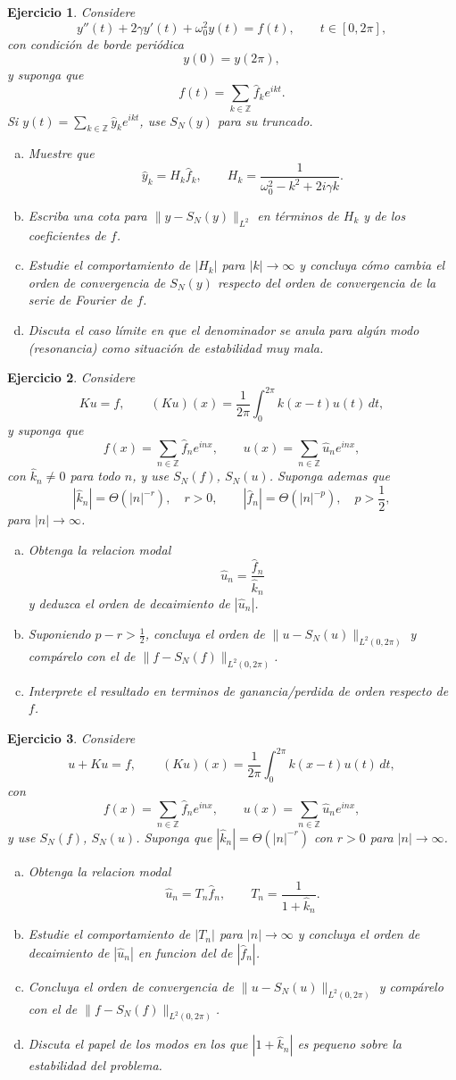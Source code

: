 \documentclass[12pt]{article}
\newtheorem{exercise}{Ejercicio}
\newcommand{\bej}{\begin{exercise}\rm}
\newcommand{\fej}{\end{exercise}}
\begin{document}
\bej
Considere
\[
y''(t)+2\gamma y'(t)+\omega_0^2y(t)=f(t),\qquad t\in[0,2\pi],
\]
con condición de borde periódica
\[
y(0)=y(2\pi),
\]
y suponga que
\[
f(t)=\sum_{k\in\mathbb Z}\hat f_k e^{ikt}.
\]
Si $y(t)=\sum_{k\in\mathbb Z}\hat y_k e^{ikt}$, use $S_N(y)$ para su truncado.
\begin{enumerate}[(a)]
    \item Muestre que
    \[
    \hat y_k=H_k\hat f_k,\qquad H_k=\frac{1}{\omega_0^2-k^2+2i\gamma k}.
    \]
    \item Escriba una cota para $\|y-S_N(y)\|_{L^2}$ en términos de $H_k$ y de los coeficientes de $f$.
    \item Estudie el comportamiento de $|H_k|$ para $|k|\to\infty$ y concluya cómo cambia el orden de convergencia de $S_N(y)$ respecto del orden de convergencia de la serie de Fourier de $f$.
    \item Discuta el caso límite en que el denominador se anula para algún modo (resonancia) como situación de estabilidad muy mala.
\end{enumerate}
\fej

\bej
Considere
\[
Ku=f,
\qquad
(Ku)(x)=\frac{1}{2\pi}\int_0^{2\pi}k(x-t)u(t)\,dt,
\]
y suponga que
\[
f(x)=\sum_{n\in\mathbb Z}\hat f_n e^{inx},
\qquad
u(x)=\sum_{n\in\mathbb Z}\hat u_n e^{inx},
\]
con $\hat k_n\neq 0$ para todo $n$, y use $S_N(f)$, $S_N(u)$.
Suponga ademas que
\[
|\hat k_n|=\Theta(|n|^{-r}),\quad r>0,
\qquad
|\hat f_n|=\Theta(|n|^{-p}),\quad p>\frac12,
\]
para $|n|\to\infty$.
\begin{enumerate}[(a)]
    \item Obtenga la relacion modal
    \[
    \hat u_n=\frac{\hat f_n}{\hat k_n}
    \]
    y deduzca el orden de decaimiento de $|\hat u_n|$.
    \item Suponiendo $p-r>\frac12$, concluya el orden de $\|u-S_N(u)\|_{L^2(0,2\pi)}$ y compárelo con el de $\|f-S_N(f)\|_{L^2(0,2\pi)}$.
    \item Interprete el resultado en terminos de ganancia/perdida de orden respecto de $f$.
\end{enumerate}
\fej

\bej
Considere
\[
u+Ku=f,
\qquad
(Ku)(x)=\frac{1}{2\pi}\int_0^{2\pi}k(x-t)u(t)\,dt,
\]
con
\[
f(x)=\sum_{n\in\mathbb Z}\hat f_n e^{inx},
\qquad
u(x)=\sum_{n\in\mathbb Z}\hat u_n e^{inx},
\]
y use $S_N(f)$, $S_N(u)$.
Suponga que $|\hat k_n|=\Theta(|n|^{-r})$ con $r>0$ para $|n|\to\infty$.
\begin{enumerate}[(a)]
    \item Obtenga la relacion modal
    \[
    \hat u_n=T_n\hat f_n,
    \qquad
    T_n=\frac{1}{1+\hat k_n}.
    \]
    \item Estudie el comportamiento de $|T_n|$ para $|n|\to\infty$ y concluya el orden de decaimiento de $|\hat u_n|$ en funcion del de $|\hat f_n|$.
    \item Concluya el orden de convergencia de $\|u-S_N(u)\|_{L^2(0,2\pi)}$ y compárelo con el de $\|f-S_N(f)\|_{L^2(0,2\pi)}$.
    \item Discuta el papel de los modos en los que $|1+\hat k_n|$ es pequeno sobre la estabilidad del problema.
\end{enumerate}
\fej
\end{document}
